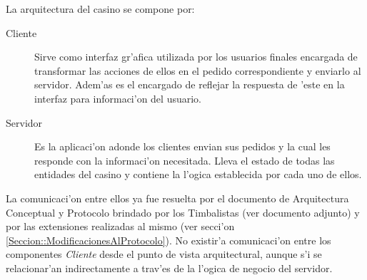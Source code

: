 La arquitectura del casino se compone por:

\begin{description}
\item[Cliente] Sirve como interfaz gr'afica utilizada por los usuarios finales encargada de transformar las acciones de ellos en el pedido correspondiente y enviarlo al servidor. Adem'as es el encargado de reflejar la respuesta de 'este en la interfaz para informaci'on del usuario.
\item[Servidor] Es la aplicaci'on adonde los clientes envian sus pedidos y la cual les responde con la informaci'on necesitada. Lleva el estado de todas las entidades del casino y contiene la l'ogica establecida por cada uno de ellos.
\end{description}

La comunicaci'on entre ellos ya fue resuelta por el documento de Arquitectura Conceptual y Protocolo brindado por los Timbalistas (ver documento adjunto) y por las extensiones realizadas al mismo (ver secci'on \ref{Seccion::ModificacionesAlProtocolo}). No existir'a comunicaci'on entre los componentes {\it Cliente} desde el punto de vista arquitectural, aunque s'i se relacionar'an indirectamente a trav'es de la l'ogica de negocio del servidor.
